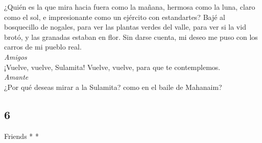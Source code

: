 \begin{paracol}{2}
 ¿Quién es la que mira hacia fuera como la mañana,
hermosa como la luna, claro como el sol, e impresionante como un
ejército con estandartes?  Bajé al bosquecillo de
nogales, para ver las plantas verdes del valle, para ver si la vid
brotó, y las granadas estaban en flor.  Sin darse cuenta,
mi deseo me puso con los carros de mi pueblo real.\\
\emph{Amigos}\\
 ¡Vuelve, vuelve, Sulamita! Vuelve, vuelve, para que te
contemplemos.\\
\emph{Amante}\\
¿Por qué deseas mirar a la Sulamita? como en el baile de Mahanaim?

\switchcolumn
\begin{otherlanguage}{english}

\hypertarget{section-11}{%
\section{6}\label{section-11}}

\emph{\hfill\break
}Friends * *\\


\end{otherlanguage}
\end{paracol}

